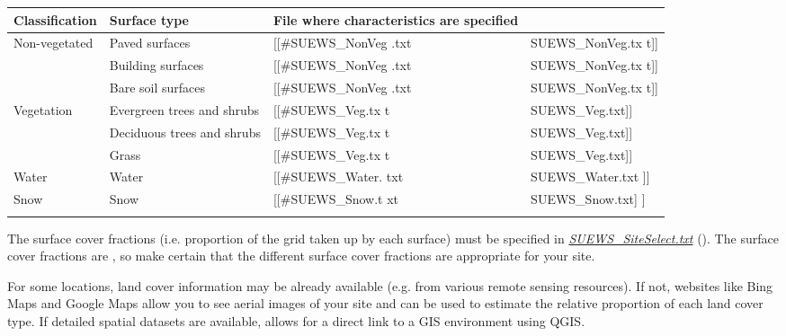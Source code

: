 \documentclass[letterpaper,10pt,english]{sphinxmanual}
\begin{document}
\begin{savenotes}\sphinxattablestart
\centering
\begin{tabulary}{\linewidth}[t]{|T|T|T|T|}
\hline
\sphinxstyletheadfamily 
Classification
&\sphinxstyletheadfamily 
Surface type
&\sphinxstyletheadfamily 
File where
characteristics
are specified
&\sphinxstyletheadfamily \\
\hline
Non-vegetated
&
Paved surfaces
&
{[}{[}\#SUEWS\_NonVeg
.txt
&
SUEWS\_NonVeg.tx
t{]}{]}
\\
\hline&
Building
surfaces
&
{[}{[}\#SUEWS\_NonVeg
.txt
&
SUEWS\_NonVeg.tx
t{]}{]}
\\
\hline&
Bare soil
surfaces
&
{[}{[}\#SUEWS\_NonVeg
.txt
&
SUEWS\_NonVeg.tx
t{]}{]}
\\
\hline
Vegetation
&
Evergreen trees
and shrubs
&
{[}{[}\#SUEWS\_Veg.tx
t
&
SUEWS\_Veg.txt{]}{]}
\\
\hline&
Deciduous trees
and shrubs
&
{[}{[}\#SUEWS\_Veg.tx
t
&
SUEWS\_Veg.txt{]}{]}
\\
\hline&
Grass
&
{[}{[}\#SUEWS\_Veg.tx
t
&
SUEWS\_Veg.txt{]}{]}
\\
\hline
Water
&
Water
&
{[}{[}\#SUEWS\_Water.
txt
&
SUEWS\_Water.txt
{]}{]}
\\
\hline
Snow
&
Snow
&
{[}{[}\#SUEWS\_Snow.t
xt
&
SUEWS\_Snow.txt{]}
{]}
\\
\hline&&&\\
\hline
\end{tabulary}
\par
\sphinxattableend\end{savenotes}

The surface cover fractions (i.e. proportion of the grid taken up by
each surface) must be specified in
{\hyperref[\detokenize{prepare-to-run-the-model:SUEWS_SiteSelect.txt}]{\emph{SUEWS\_SiteSelect.txt}}} (). The surface cover
fractions are , so make certain that the different surface
cover fractions are appropriate for your site.

For some locations, land cover information may be already available
(e.g. from various remote sensing resources). If not, websites like Bing
Maps and Google Maps allow you to see aerial images of your site and can
be used to estimate the relative proportion of each land cover type. If
detailed spatial datasets are available,
 allows for a direct link
to a GIS environment using QGIS.
\end{document}
